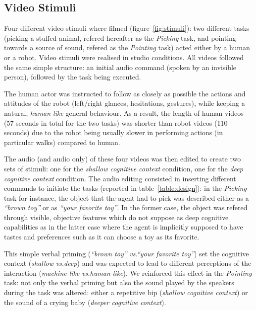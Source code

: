 \documentclass[lettersize, noapacite, twoside, HRI]{apa_HRI}
\newcommand{\vs}{\textit{vs.}\xspace}
\begin{document}
\subsection{Video Stimuli}

Four different video stimuli where filmed (figure~\ref{fig:stimuli}): two
different tasks (picking a stuffed animal, refered hereafter as the
\emph{Picking} task, and pointing towards a source of sound, refered as the
\emph{Pointing} task) acted either by a human or a robot. Video stimuli were
realised in studio conditions. All videos followed the same simple structure: an
initial audio command (spoken by an invisible person), followed by the task
being executed.

The human actor was instructed to follow as closely as possible the actions and
attitudes of the robot (left/right glances, hesitations, gestures), while keeping a
natural, \emph{human-like} general behaviour. As a result, the length of human videos
(57 seconds in total for the two tasks) was shorter than robot videos (110
seconds) due to the robot being usually slower in performing actions (in
particular walks) compared to human.

The audio (and audio only) of these four videos was then edited to create two
sets of stimuli: one for the \emph{shallow cognitive context} condition, one for
the \emph{deep cognitive context} condition. The audio editing consisted in
inserting different commands to initiate the tasks (reported in
table~\ref{table:design}): in the \emph{Picking} task for instance, the object
that the agent had to pick was described either as a \emph{``brown toy''} or as
\emph{``your favorite toy''}. In the former case, the object was refered through
visible, objective features which do not suppose as deep cognitive capabilities
as in the latter case where the agent is implicitly supposed to have
tastes and preferences such as it can choose a toy as its favorite.

This simple verbal priming (\emph{``brown toy''} \vs \emph{``your favorite
toy''}) set the cognitive context (\emph{shallow} \vs \emph{deep}) and was
expected to lead to different perceptions of the interaction
(\emph{machine-like} \vs \emph{human-like}). We reinforced this effect in the
\emph{Pointing} task: not only the verbal priming but also the sound played by the
speakers during the task was altered: either a repetitive bip (\emph{shallow
cognitive context}) or the sound of a crying baby (\emph{deeper cognitive
context}).
\end{document}
